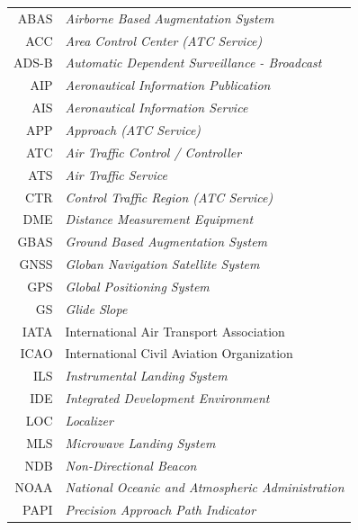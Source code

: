 \begin{table}[!hbtp]
\footnotesize
	\begin{center}
		\begin{tabular}{r l}
		ABAS	& \textit{Airborne Based Augmentation System} \\		
		ACC		& \textit{Area Control Center (ATC Service)} \\
		ADS-B	& \textit{Automatic Dependent Surveillance - Broadcast} \\
		AIP		& \textit{Aeronautical Information Publication} \\
		AIS		& \textit{Aeronautical Information Service} \\
		APP		& \textit{Approach (ATC Service)} \\
		ATC		& \textit{Air Traffic Control / Controller} \\
		ATS		& \textit{Air Traffic Service} \\
		CTR		& \textit{Control Traffic Region (ATC Service)} \\
		DME		& \textit{Distance Measurement Equipment} \\	
		GBAS	& \textit{Ground Based Augmentation System} \\
		GNSS	& \textit{Globan Navigation Satellite System} \\
		GPS 	& \textit{Global Positioning System} \\
		GS		& \textit{Glide Slope} \\				
		IATA 	& International Air Transport Association \\
		ICAO	& International Civil Aviation Organization \\
		ILS		& \textit{Instrumental Landing System} \\
		IDE		& \textit{Integrated Development Environment} \\
		LOC		& \textit{Localizer} \\
		MLS		& \textit{Microwave Landing System} \\
		NDB		& \textit{Non-Directional Beacon} \\
		NOAA	& \textit{National Oceanic and Atmospheric Administration} \\
		PAPI	& \textit{Precision Approach Path Indicator} \\

\end{tabular}
\end{center}
\end{table}
